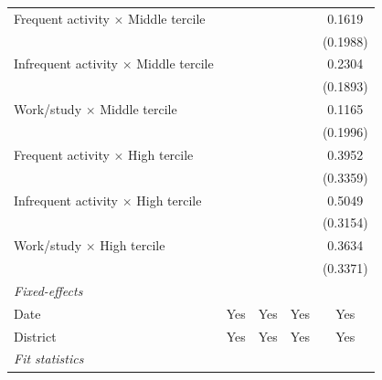 \begin{table}[htbp]
\begin{tabular}{lcccc}
      Frequent activity $\times$ Middle tercile    &                       &                      &                      & 0.1619\\   
                                                   &                       &                      &                      & (0.1988)\\   
      Infrequent activity $\times$ Middle tercile  &                       &                      &                      & 0.2304\\   
                                                   &                       &                      &                      & (0.1893)\\   
      Work/study $\times$ Middle tercile           &                       &                      &                      & 0.1165\\   
                                                   &                       &                      &                      & (0.1996)\\   
      Frequent activity $\times$ High tercile      &                       &                      &                      & 0.3952\\   
                                                   &                       &                      &                      & (0.3359)\\   
      Infrequent activity $\times$ High tercile    &                       &                      &                      & 0.5049\\   
                                                   &                       &                      &                      & (0.3154)\\   
      Work/study $\times$ High tercile             &                       &                      &                      & 0.3634\\   
                                                   &                       &                      &                      & (0.3371)\\   
      \midrule
      \emph{Fixed-effects}\\
      Date                                         & Yes                   & Yes                  & Yes                  & Yes\\  
      District                                     & Yes                   & Yes                  & Yes                  & Yes\\  
      \midrule
      \emph{Fit statistics}\\

\end{tabular}
\end{table}
